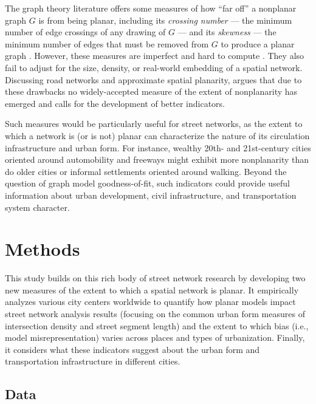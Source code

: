 \documentclass[Afour,sageh,times]{sagej}
\begin{document}
The graph theory literature offers some measures of how \enquote{far off} a nonplanar graph $G$ is from being planar, including its \emph{crossing number} --- the minimum number of edge crossings of any drawing of $G$ --- and its \emph{skewness} --- the minimum number of edges that must be removed from $G$ to produce a planar graph \citep{liebers_planarizing_2001,chimani_non-planar_2009}. However, these measures are imperfect and hard to compute \citep{szekely_successful_2004,chimani_vertex_2012}. They also fail to adjust for the size, density, or real-world embedding of a spatial network. Discussing road networks and approximate spatial planarity, \citet[p.~133]{newman_networks:_2010} argues that due to these drawbacks no widely-accepted measure of the extent of nonplanarity has emerged and calls for the development of better indicators.

Such measures would be particularly useful for street networks, as the extent to which a network is (or is not) planar can characterize the nature of its circulation infrastructure and urban form. For instance, wealthy 20th- and 21st-century cities oriented around automobility and freeways might exhibit more nonplanarity than do older cities or informal settlements oriented around walking. Beyond the question of graph model goodness-of-fit, such indicators could provide useful information about urban development, civil infrastructure, and transportation system character.



\section{Methods}

This study builds on this rich body of street network research by developing two new measures of the extent to which a spatial network is planar. It empirically analyzes various city centers worldwide to quantify how planar models impact street network analysis results (focusing on the common urban form measures of intersection density and street segment length) and the extent to which bias (i.e., model misrepresentation) varies across places and types of urbanization. Finally, it considers what these indicators suggest about the urban form and transportation infrastructure in different cities.

\subsection{Data}
\end{document}
